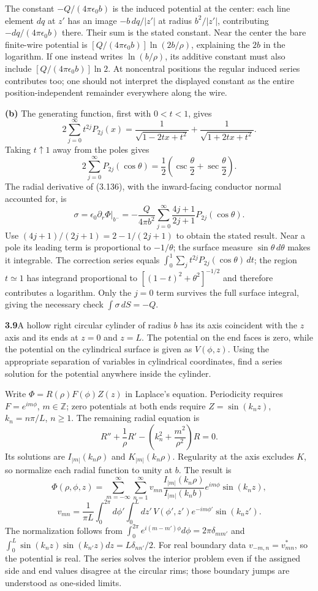 The constant $-Q/(4\pi\epsilon_0b)$ is the induced potential at
the center: each line element $dq$ at $z'$ has an image
$-b\,dq/|z'|$ at radius $b^2/|z'|$, contributing
$-dq/(4\pi\epsilon_0b)$ there.  Their sum is the stated constant.
Near the center the bare finite-wire potential is
$[Q/(4\pi\epsilon_0b)]\ln(2b/\rho)$, explaining the $2b$ in the
logarithm.  If one instead writes $\ln(b/\rho)$, its additive
constant must also include $[Q/(4\pi\epsilon_0b)]\ln2$.
At noncentral positions the regular induced series contributes too;
one should not interpret the displayed constant as the entire
position-independent remainder everywhere along the wire.

\textbf{(b)} The generating function, first with $0<t<1$, gives
\[
2\sum_{j=0}^\infty t^{2j}P_{2j}(x)
=\frac1{\sqrt{1-2tx+t^2}}+
\frac1{\sqrt{1+2tx+t^2}}.
\]
Taking $t\uparrow1$ away from the poles gives
\[
2\sum_{j=0}^\infty P_{2j}(\cos\theta)
=\frac12\left(\csc\frac\theta2+\sec\frac\theta2\right).
\]
The radial derivative of (3.136), with the inward-facing conductor
normal accounted for, is
\[
\sigma=\epsilon_0\partial_r\Phi\big|_{b^-}
=-\frac{Q}{4\pi b^2}\sum_{j=0}^\infty
\frac{4j+1}{2j+1}P_{2j}(\cos\theta).
\]
Use $(4j+1)/(2j+1)=2-1/(2j+1)$ to obtain the stated result.
Near a pole its leading term is proportional to $-1/\theta$;
the surface measure $\sin\theta\,d\theta$ makes it integrable.
The correction series equals
$\int_0^1\sum_jt^{2j}P_{2j}(\cos\theta)\,dt$; the region
$t\simeq1$ has integrand proportional to
$[(1-t)^2+\theta^2]^{-1/2}$ and therefore contributes a logarithm.
Only the $j=0$ term survives the full surface integral, giving the
necessary check $\int\sigma\,dS=-Q$.

\par\bigskip
\noindent\textbf{3.9}\quad A hollow right circular cylinder of radius $b$ has its axis coincident with the $z$ axis and its ends at $z=0$ and $z=L$. The potential on the end faces is zero, while the potential on the cylindrical surface is given as $V(\phi,z)$. Using the appropriate separation of variables in cylindrical coordinates, find a series solution for the potential anywhere inside the cylinder.
\solution

Write $\Phi=R(\rho)F(\phi)Z(z)$ in Laplace's equation.  Periodicity
requires $F=e^{im\phi}$, $m\in\mathbb Z$; zero potentials at both
ends require $Z=\sin(k_nz)$, $k_n=n\pi/L$, $n\geq1$.
The remaining radial equation is
\[
R''+\frac1\rho R'-\left(k_n^2+\frac{m^2}{\rho^2}\right)R=0.
\]
Its solutions are $I_{|m|}(k_n\rho)$ and $K_{|m|}(k_n\rho)$.
Regularity at the axis excludes $K$, so normalize each radial function
to unity at $b$.  The result is
\[
\boxed{\Phi(\rho,\phi,z)=\sum_{m=-\infty}^\infty\sum_{n=1}^\infty
v_{mn}\frac{I_{|m|}(k_n\rho)}{I_{|m|}(k_nb)}
e^{im\phi}\sin(k_nz),}
\]
\[
v_{mn}=\frac1{\pi L}\int_0^{2\pi}d\phi'\int_0^Ldz'\,
V(\phi',z')e^{-im\phi'}\sin(k_nz').
\]
The normalization follows from $\int_0^{2\pi}e^{i(m-m')\phi}d\phi
=2\pi\delta_{mm'}$ and
$\int_0^L\sin(k_nz)\sin(k_{n'}z)dz=L\delta_{nn'}/2$.
For real boundary data $v_{-m,n}=v_{mn}^*$, so the potential is real.
The series solves the interior problem even if the assigned side and
end values disagree at the circular rims; those boundary jumps are
understood as one-sided limits.

